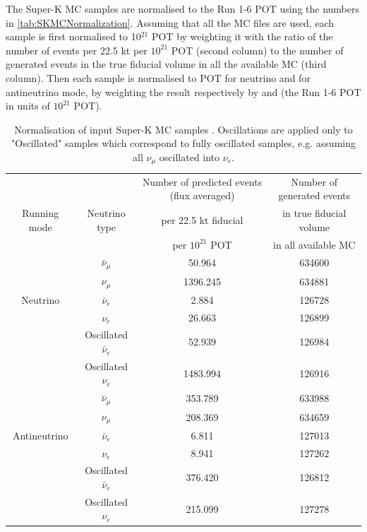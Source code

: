 The Super-K MC samples are normalised to the Run 1-6 POT 
using the numbers in \cref{tab:SKMCNormalization}. 
Assuming that all the MC files are used, each sample is first normalised to 10$^{21}$ POT by weighting it 
with the ratio of the number of events per 22.5 kt per $10^{21}$ POT (second column) to the number of generated 
events in the true fiducial volume in all the available MC (third column). 
Then each sample is normalised to  
\TotalPotNu{} POT for neutrino and \TotalPotNuBar{} for antineutrino mode,
by weighting the result respectively by 
\TotalPotPerTwentyOneNu{}
and 
\TotalPotPerTwentyOneNuBar{}
(the Run 1-6 POT in units of $10^{21}$ POT). 
\begin{table}
\centering
\begin{tabular}{| c | c | c | c |}
\hline
 				&                       &  Number of predicted events (flux averaged)     & Number of generated events \\
     Running mode     & Neutrino type & per 22.5 kt fiducial 			 & in true fiducial volume    \\
                       	  	&		         & per $10^{21}$ POT     			& in all available MC        \\  
\hline             
	 		&$\bar{\nu}_{\mu}$             &     50.964           &       634600               \\
			&$\nu_{\mu}$                   &     1396.245           &       634881               \\
Neutrino		&$\bar{\nu}_{e}$               &      2.884            &       126728               \\
			&$\nu_{e}$                     &      26.663            &       126899               \\
			&Oscillated $\bar{\nu}_{e}$    &     52.939           &       126984               \\
			&Oscillated $\nu_{e}$          &     1483.994           &       126916               \\
\hline
		 		&$\bar{\nu}_{\mu}$             &     353.789           &       633988               \\
				&$\nu_{\mu}$                   &     208.369           &       634659               \\
Antineutrino		&$\bar{\nu}_{e}$               &      6.811            &       127013               \\
				&$\nu_{e}$                     &      8.941            &       127262               \\
				&Oscillated $\bar{\nu}_{e}$    &     376.420           &       126812               \\
				&Oscillated $\nu_{e}$          &     215.099           &       127278               \\
	
\hline
\end{tabular}
\caption{
  Normalisation of input Super-K MC samples \cite{SuperkMC14a}. Oscillations are applied only to "Oscillated" samples
  which correspond to fully oscillated samples, e.g. assuming all $\nu_{\mu}$ oscillated into $\nu_e$.
}
\label{tab:SKMCNormalisation}
\end{table}
